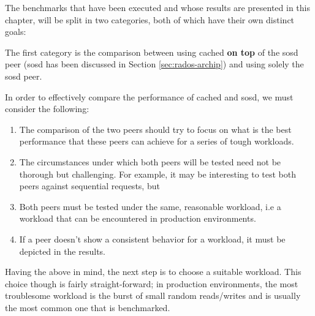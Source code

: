 The benchmarks that have been executed and whose results are presented in this 
chapter, will be split in two categories, both of which have their own distinct 
goals:

The first category is the comparison between using cached \textbf{on top} of 
the sosd peer (sosd has been discussed in Section \ref{sec:rados-archip}) and 
using solely the sosd peer.

\begin{comment}
The category's goal is to "defend" one of the core thesis arguments, that 
tiering is a key element that will improve the performance of Archipelago.  
\end{comment}

In order to effectively compare the performance of cached and sosd, we must 
consider the following: 

\begin{enumerate}
	\item The comparison of the two peers should try to focus on what is 
		the best performance that these peers can achieve for a series 
		of tough workloads.
	\item The circumstances under which both peers will be tested need not 
		be thorough but challenging. For example, it may be interesting 
		to test both peers against sequential requests, but
	\item Both peers must be tested under the same, reasonable workload, i.e a 
		workload that can be encountered in production environments.
	\item If a peer doesn't show a consistent behavior for a workload, it must 
		be depicted in the results.
\end{enumerate}

Having the above in mind, the next step is to choose a suitable workload.  This 
choice though is fairly straight-forward; in production environments, the most 
troublesome workload is the burst of small random reads/writes and is usually 
the most common one that is benchmarked.  

